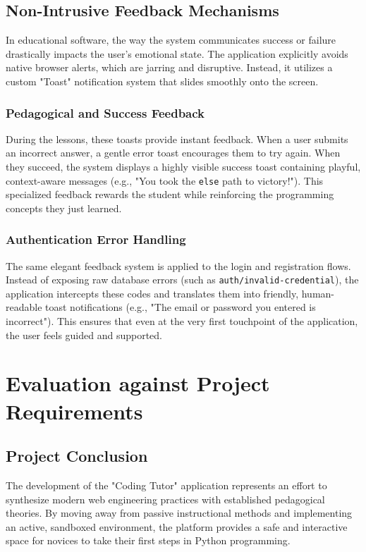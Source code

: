 \documentclass[12pt]{report}
\begin{document}
\section{Non-Intrusive Feedback Mechanisms}
In educational software, the way the system communicates success or failure drastically impacts the user's emotional state. The application explicitly avoids native browser alerts, which are jarring and disruptive. Instead, it utilizes a custom "Toast" notification system that slides smoothly onto the screen.

\subsection{Pedagogical and Success Feedback}
During the lessons, these toasts provide instant feedback. When a user submits an incorrect answer, a gentle error toast encourages them to try again. When they succeed, the system displays a highly visible success toast containing playful, context-aware messages (e.g., "You took the \texttt{else} path to victory!"). This specialized feedback rewards the student while reinforcing the programming concepts they just learned.

\subsection{Authentication Error Handling}
The same elegant feedback system is applied to the login and registration flows. Instead of exposing raw database errors (such as \texttt{auth/invalid-credential}), the application intercepts these codes and translates them into friendly, human-readable toast notifications (e.g., "The email or password you entered is incorrect"). This ensures that even at the very first touchpoint of the application, the user feels guided and supported.

\chapter{Evaluation against Project Requirements}
\label{ch:evaluation}

\section{Project Conclusion}
The development of the "Coding Tutor" application represents an effort to synthesize modern web engineering practices with established pedagogical theories. By moving away from passive instructional methods and implementing an active, sandboxed environment, the platform provides a safe and interactive space for novices to take their first steps in Python programming. 
\end{document}
